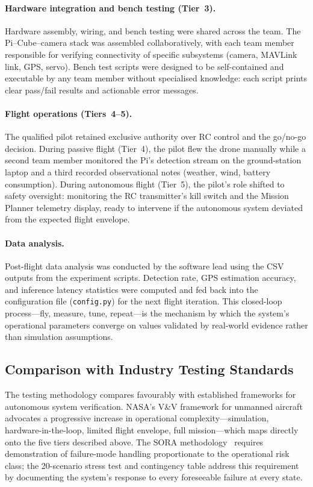 \paragraph{Hardware integration and bench testing (Tier~3).}
Hardware assembly, wiring, and bench testing were shared across the team.  The Pi--Cube--camera stack was assembled collaboratively, with each team member responsible for verifying connectivity of specific subsystems (camera, MAVLink link, GPS, servo).  Bench test scripts were designed to be self-contained and executable by any team member without specialised knowledge: each script prints clear pass/fail results and actionable error messages.

\paragraph{Flight operations (Tiers~4--5).}
The qualified pilot retained exclusive authority over RC control and the go/no-go decision.  During passive flight (Tier~4), the pilot flew the drone manually while a second team member monitored the Pi's detection stream on the ground-station laptop and a third recorded observational notes (weather, wind, battery consumption).  During autonomous flight (Tier~5), the pilot's role shifted to safety oversight: monitoring the RC transmitter's kill switch and the Mission Planner telemetry display, ready to intervene if the autonomous system deviated from the expected flight envelope.

\paragraph{Data analysis.}
Post-flight data analysis was conducted by the software lead using the CSV outputs from the experiment scripts.  Detection rate, GPS estimation accuracy, and inference latency statistics were computed and fed back into the configuration file (\texttt{config.py}) for the next flight iteration.  This closed-loop process---fly, measure, tune, repeat---is the mechanism by which the system's operational parameters converge on values validated by real-world evidence rather than simulation assumptions.

\subsection{Comparison with Industry Testing Standards}\label{sec:industry-comparison}

The testing methodology compares favourably with established frameworks for autonomous system verification. NASA's V\&V framework for unmanned aircraft~\cite{nasa2015vv} advocates a progressive increase in operational complexity---simulation, hardware-in-the-loop, limited flight envelope, full mission---which maps directly onto the five tiers described above. The SORA methodology~\cite{jarus2019sora} requires demonstration of failure-mode handling proportionate to the operational risk class; the 20-scenario stress test and contingency table address this requirement by documenting the system's response to every foreseeable failure at every state.

